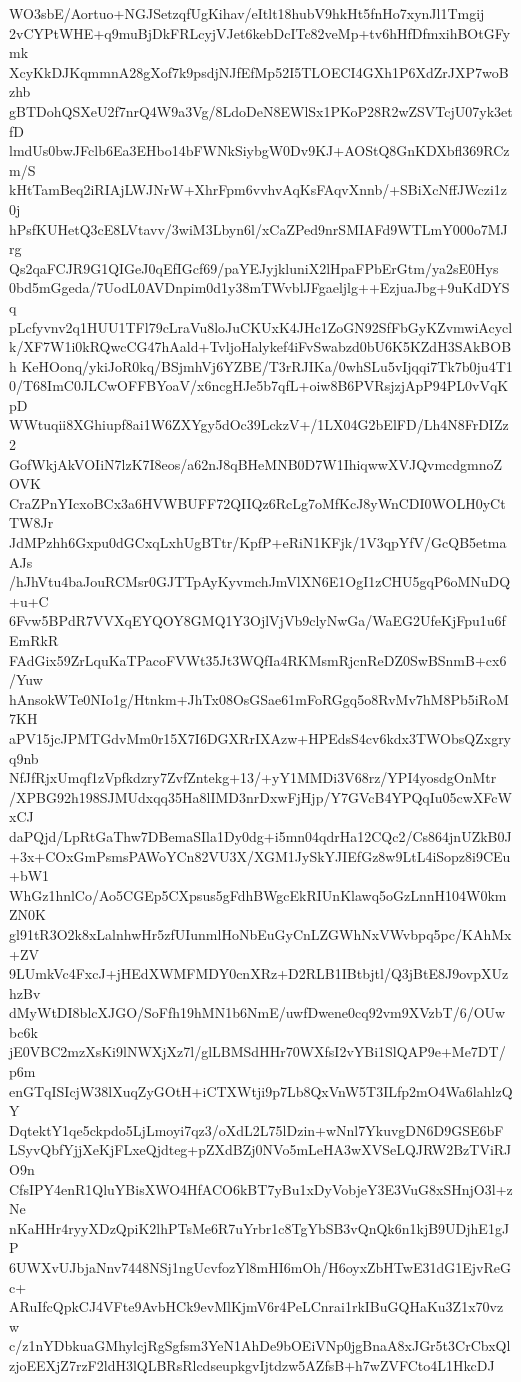 WO3sbE/Aortuo+NGJSetzqfUgKihav/eItlt18hubV9hkHt5fnHo7xynJl1Tmgij
2vCYPtWHE+q9muBjDkFRLcyjVJet6kebDcITc82veMp+tv6hHfDfmxihBOtGFymk
XcyKkDJKqmmnA28gXof7k9psdjNJfEfMp52I5TLOECI4GXh1P6XdZrJXP7woBzhb
gBTDohQSXeU2f7nrQ4W9a3Vg/8LdoDeN8EWlSx1PKoP28R2wZSVTcjU07yk3etfD
lmdUs0bwJFclb6Ea3EHbo14bFWNkSiybgW0Dv9KJ+AOStQ8GnKDXbfl369RCzm/S
kHtTamBeq2iRIAjLWJNrW+XhrFpm6vvhvAqKsFAqvXnnb/+SBiXcNffJWczi1z0j
hPsfKUHetQ3cE8LVtavv/3wiM3Lbyn6l/xCaZPed9nrSMIAFd9WTLmY000o7MJrg
Qs2qaFCJR9G1QIGeJ0qEfIGcf69/paYEJyjkluniX2lHpaFPbErGtm/ya2sE0Hys
0bd5mGgeda/7UodL0AVDnpim0d1y38mTWvblJFgaeljlg++EzjuaJbg+9uKdDYSq
pLcfyvnv2q1HUU1TFl79cLraVu8loJuCKUxK4JHc1ZoGN92SfFbGyKZvmwiAcycl
k/XF7W1i0kRQwcCG47hAald+TvljoHalykef4iFvSwabzd0bU6K5KZdH3SAkBOBh
KeHOonq/ykiJoR0kq/BSjmhVj6YZBE/T3rRJIKa/0whSLu5vIjqqi7Tk7b0ju4T1
0/T68ImC0JLCwOFFBYoaV/x6ncgHJe5b7qfL+oiw8B6PVRsjzjApP94PL0vVqKpD
WWtuqii8XGhiupf8ai1W6ZXYgy5dOc39LckzV+/1LX04G2bElFD/Lh4N8FrDIZz2
GofWkjAkVOIiN7lzK7I8eos/a62nJ8qBHeMNB0D7W1IhiqwwXVJQvmcdgmnoZOVK
CraZPnYIcxoBCx3a6HVWBUFF72QIIQz6RcLg7oMfKcJ8yWnCDI0WOLH0yCtTW8Jr
JdMPzhh6Gxpu0dGCxqLxhUgBTtr/KpfP+eRiN1KFjk/1V3qpYfV/GcQB5etmaAJs
/hJhVtu4baJouRCMsr0GJTTpAyKyvmchJmVlXN6E1OgI1zCHU5gqP6oMNuDQ+u+C
6Fvw5BPdR7VVXqEYQOY8GMQ1Y3OjlVjVb9clyNwGa/WaEG2UfeKjFpu1u6fEmRkR
FAdGix59ZrLquKaTPacoFVWt35Jt3WQfIa4RKMsmRjcnReDZ0SwBSnmB+cx6/Yuw
hAnsokWTe0NIo1g/Htnkm+JhTx08OsGSae61mFoRGgq5o8RvMv7hM8Pb5iRoM7KH
aPV15jcJPMTGdvMm0r15X7I6DGXRrIXAzw+HPEdsS4cv6kdx3TWObsQZxgryq9nb
NfJfRjxUmqf1zVpfkdzry7ZvfZntekg+13/+yY1MMDi3V68rz/YPI4yosdgOnMtr
/XPBG92h198SJMUdxqq35Ha8lIMD3nrDxwFjHjp/Y7GVcB4YPQqIu05cwXFcWxCJ
daPQjd/LpRtGaThw7DBemaSIla1Dy0dg+i5mn04qdrHa12CQc2/Cs864jnUZkB0J
+3x+COxGmPsmsPAWoYCn82VU3X/XGM1JySkYJIEfGz8w9LtL4iSopz8i9CEu+bW1
WhGz1hnlCo/Ao5CGEp5CXpsus5gFdhBWgcEkRIUnKlawq5oGzLnnH104W0kmZN0K
gl91tR3O2k8xLalnhwHr5zfUIunmlHoNbEuGyCnLZGWhNxVWvbpq5pc/KAhMx+ZV
9LUmkVc4FxcJ+jHEdXWMFMDY0cnXRz+D2RLB1IBtbjtl/Q3jBtE8J9ovpXUzhzBv
dMyWtDI8blcXJGO/SoFfh19hMN1b6NmE/uwfDwene0cq92vm9XVzbT/6/OUwbc6k
jE0VBC2mzXsKi9lNWXjXz7l/glLBMSdHHr70WXfsI2vYBi1SlQAP9e+Me7DT/p6m
enGTqISIcjW38lXuqZyGOtH+iCTXWtji9p7Lb8QxVnW5T3ILfp2mO4Wa6lahlzQY
DqtektY1qe5ckpdo5LjLmoyi7qz3/oXdL2L75lDzin+wNnl7YkuvgDN6D9GSE6bF
LSyvQbfYjjXeKjFLxeQjdteg+pZXdBZj0NVo5mLeHA3wXVSeLQJRW2BzTViRJO9n
CfsIPY4enR1QluYBisXWO4HfACO6kBT7yBu1xDyVobjeY3E3VuG8xSHnjO3l+zNe
nKaHHr4ryyXDzQpiK2lhPTsMe6R7uYrbr1c8TgYbSB3vQnQk6n1kjB9UDjhE1gJP
6UWXvUJbjaNnv7448NSj1ngUcvfozYl8mHI6mOh/H6oyxZbHTwE31dG1EjvReGc+
ARuIfcQpkCJ4VFte9AvbHCk9evMlKjmV6r4PeLCnrai1rkIBuGQHaKu3Z1x70vzw
c/z1nYDbkuaGMhylcjRgSgfsm3YeN1AhDe9bOEiVNp0jgBnaA8xJGr5t3CrCbxQl
zjoEEXjZ7rzF2ldH3lQLBRsRlcdseupkgvIjtdzw5AZfsB+h7wZVFCto4L1HkcDJ
